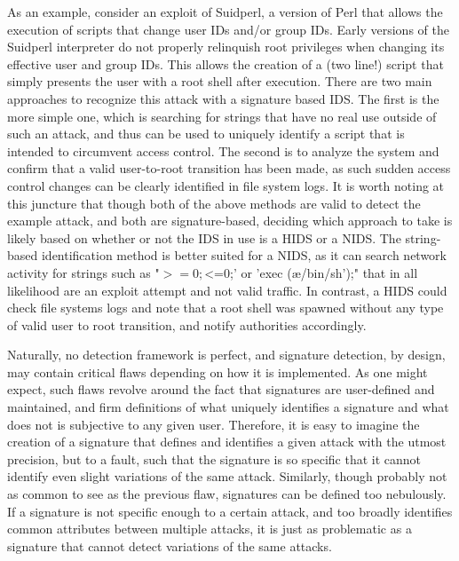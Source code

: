\documentclass{acm_proc_article-sp}
\begin{document}
	    	As an example, consider an exploit of Suidperl, a version of Perl that allows the execution of scripts that change user IDs and/or group IDs. Early versions of the Suidperl interpreter do not properly relinquish  root privileges when changing its effective user and group IDs. This allows the creation of a (two line!) script that simply presents the user with a root shell after execution. There are two main approaches to recognize this attack with a signature based IDS. The first is the more simple one, which is searching for strings that have no real use outside of such an attack, and thus can be used to uniquely identify a script that is intended to circumvent access control. The second is to analyze the system and confirm that a valid user-to-root transition has been made, as such sudden access control changes can be clearly identified in file system logs. It is worth noting at this juncture that though both of the above methods are valid to detect the example attack, and both are signature-based, deciding which approach to take is likely based on whether or not the IDS in use is a HIDS or a NIDS. The string-based identification method is better suited for a NIDS, as it can search network activity for strings such as "$>=0; $<=0;' or 'exec (æ/bin/sh');" that in all likelihood are an exploit attempt and not valid traffic. In contrast, a HIDS could check file systems logs and note that a root shell was spawned without any type of valid user to root transition, and notify authorities accordingly. 
	    	
	    	Naturally, no detection framework is perfect, and signature detection, by design, may contain critical flaws depending on how it is implemented. As one might expect, such flaws revolve around the fact that signatures are user-defined and maintained, and firm definitions of what uniquely identifies a signature and what does not is subjective to any given user. Therefore, it is easy to imagine the creation of a signature that defines and identifies a given attack with the utmost precision, but to a fault, such that the signature is so specific that it cannot identify even slight variations of the same attack. Similarly, though probably not as common to see as the previous flaw, signatures can be defined too nebulously. If a signature is not specific enough to a certain attack, and too broadly identifies common attributes between multiple attacks, it is just as problematic as a signature that cannot detect variations of the same attacks.
\end{document}
